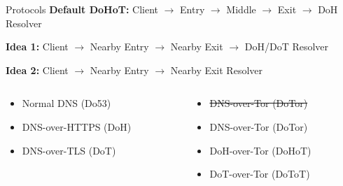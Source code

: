 \documentclass[xcolor=x11names,dvipsnames,aspectratio=169]{beamer}
\begin{document}
    \begin{frame}{Protocols}
        \textbf{Default DoHoT:}
        Client $\rightarrow$
        Entry $\rightarrow$
        Middle $\rightarrow$
        Exit $\rightarrow$
        DoH Resolver

        \pause
        \vspace{1em}
        \textbf{Idea 1:}
        Client $\rightarrow$
        Nearby Entry $\rightarrow$
        Nearby Exit $\rightarrow$
        DoH/DoT Resolver

        \pause
        \vspace{1em}
        \textbf{Idea 2:}
        Client $\rightarrow$
        Nearby Entry $\rightarrow$
        Nearby Exit Resolver

        \pause
        \vspace{2em}
        \begin{columns}
            \begin{column}{.5\textwidth}
                \begin{itemize}
                    \item Normal DNS (Do53)
                    \item DNS-over-HTTPS (DoH)
                    \item DNS-over-TLS (DoT)
                \end{itemize}
            \end{column}
            \pause
            \begin{column}{.5\textwidth}
                \begin{itemize}
                    \item \sout{DNS-over-Tor (DoTor)}
                    \item DNS-over-Tor (DoTor)
                    \item DoH-over-Tor (DoHoT)
                    \item DoT-over-Tor (DoToT)
                \end{itemize}
            \end{column}
        \end{columns}
    \end{frame}
\end{document}
